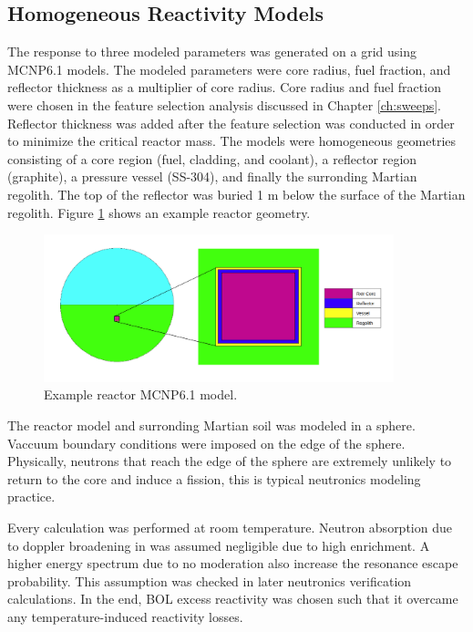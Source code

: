 \subsection{Homogeneous Reactivity Models}
The \keff response to three modeled parameters was generated on a grid using
MCNP6.1 models. The modeled parameters were core radius, fuel fraction, and
reflector thickness as a multiplier of core radius. Core radius and fuel
fraction were chosen in the feature selection analysis discussed in Chapter
\ref{ch:sweeps}. Reflector thickness was added after the feature selection was
conducted in order to minimize the critical reactor mass. 
The models were homogeneous geometries consisting of
a core region (fuel, cladding, and coolant), a reflector region (graphite), a
pressure vessel (SS-304), and finally the surronding Martian regolith. The top of the
reflector was buried 1 m below the surface of the Martian regolith. Figure
\ref{fig:homog_model} shows an example reactor geometry.

\begin{figure}[h]
    \centering
    \includegraphics[width=4in]{../images/crit_model_geom.png}
\caption{Example reactor MCNP6.1 model.}
\label{fig:homog_model}
\end{figure}

The reactor model and surronding Martian soil was modeled in a sphere. Vaccuum
boundary conditions were imposed on the edge of the sphere. Physically, neutrons
that reach the edge of the sphere are extremely unlikely to return to the core
and induce a fission, this is typical neutronics modeling practice.

Every \keff calculation was performed at room temperature. Neutron absorption
due to doppler broadening in 
\urantwo was assumed negligible due to high enrichment. A higher energy
spectrum due to no moderation also increase the resonance escape probability.
This assumption was checked in later neutronics verification calculations. 
In the end, BOL excess reactivity was chosen such that it overcame any 
temperature-induced reactivity losses. 

